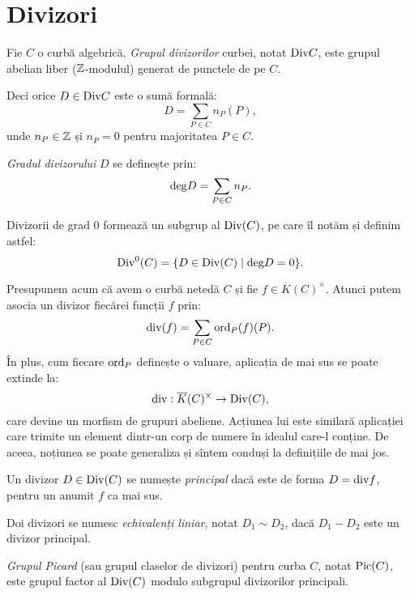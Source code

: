 
\section{Divizori}

\begin{definition}\label{def:divizor}
    Fie $ C $ o curbă algebrică. \emph{Grupul divizorilor} curbei, notat
    $ \mathrm{Div}C $, este grupul abelian liber ($ \mathbb{Z} $-modulul) generat de
    punctele de pe $ C $.

    Deci orice $ D \in \mathrm{Div}C $ este o sumă formală:
    \[
        D = \sum_{P \in C} n_P(P),
    \]
    unde $ n_P \in \mathbb{Z} $ și $ n_P = 0 $ pentru majoritatea $ P \in C $.

    \emph{Gradul divizorului} $ D $ se definește prin:
    \[
        \mathrm{deg} D = \sum_{P \in C} n_P.
    \]
\end{definition}

Divizorii de grad 0 formează un subgrup al $ \mathrm{Div}(C) $, pe care
îl notăm și definim astfel:
\[
    \mathrm{Div}^0(C) = \{ D \in \mathrm{Div}(C) \mid \mathrm{deg} D = 0 \}.
\]

Presupunem acum că avem o curbă netedă $ C $ și fie $ f \in \overline{K}(C)^\times $.
Atunci putem asocia un divizor fiecărei funcții $ f $ prin:
\[
    \mathrm{div}(f) = \sum_{P \in C} \mathrm{ord}_P(f)(P).
\]
În plus, cum fiecare $ \mathrm{ord}_P $ definește o valuare, aplicația de mai
sus se poate extinde la:
\[
    \mathrm{div} : \overline{K}(C)^\times \to \mathrm{Div}(C),
\]
care devine un morfism de grupuri abeliene. Acțiunea lui este similară aplicației
care trimite un element dintr-un corp de numere în idealul care-l conține.
De aceea, noțiunea se poate generaliza și sîntem conduși la definițiile de mai jos.

\begin{definition}\label{def:divizori-pr}
    Un divizor $ D \in \mathrm{Div}(C) $ se numește \emph{principal} dacă este de
    forma $ D = \mathrm{div}f $, pentru un anumit $ f $ ca mai sus.

    Doi divizori se numesc \emph{echivalenți liniar}, notat $ D_1 \sim D_2 $,
    dacă $ D_1 - D_2 $ este un divizor principal.

    \emph{Grupul Picard} (sau grupul claselor de divizori) pentru curba $ C $,
    notat $ \mathrm{Pic}(C) $, este grupul factor al $ \mathrm{Div}(C) $ modulo
    subgrupul divizorilor principali.
\end{definition}

